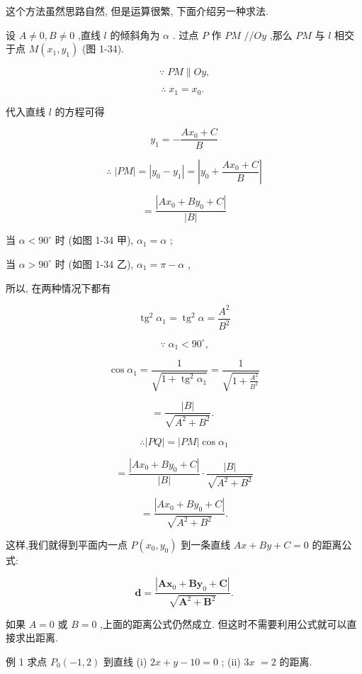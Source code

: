 \documentclass[lang=cn,newtx,12pt,scheme=chinese]{elegantbook}
\begin{document}
这个方法虽然思路自然, 但是运算很繁, 下面介绍另一种求法.

设 \(A \neq 0,B \neq 0\) ,直线 \(l\) 的倾斜角为 \(\alpha\) . 过点 \(P\) 作 \({PM}\) \(//{Oy}\) ,那么 \({PM}\) 与 \(l\) 相交于点 \(M\left( {{x}_{1},{y}_{1}}\right)\) (图 1-34).

\[
  \because \;{PM}\parallel {Oy}\text{,}
\]

\[
  \therefore \;{x}_{1} = {x}_{0}\text{. }
\]

代入直线 \(l\) 的方程可得

\[
    {y}_{1} = - \frac{A{x}_{0} + C}{B}
\]

\[
  \therefore \;\left| {PM}\right| = \left| {{y}_{0} - {y}_{1}}\right| = \left| {{y}_{0} + \frac{A{x}_{0} + C}{B}}\right|
\]

\[
  = \frac{\left| A{x}_{0} + B{y}_{0} + C\right| }{\left| B\right| }
\]

当 \(\alpha < {90}^{ \circ }\) 时 (如图 1-34 甲), \({\alpha }_{1} = \alpha\) ;

当 \(\alpha > {90}^{ \circ }\) 时 (如图 1-34 乙), \({\alpha }_{1} = \pi - \alpha\) ,

所以, 在两种情况下都有

\[
    {\operatorname{tg}}^{2}{\alpha }_{1} = {\operatorname{tg}}^{2}\alpha = \frac{{A}^{2}}{{B}^{2}}
\]

\[
  \because \;{\alpha }_{1} < {90}^{ \circ }\text{,}
\]

\[
  \cos {\alpha }_{1} = \frac{1}{\sqrt{1 + {\operatorname{tg}}^{2}{\alpha }_{1}}} = \frac{1}{\sqrt{1 + \frac{{A}^{2}}{{B}^{2}}}}
\]

\[
  = \frac{\left| B\right| }{\sqrt{{A}^{2} + {B}^{2}}}\text{. }
\]

\[
  \therefore \left| {PQ}\right| = \left| {PM}\right| \cos {\alpha }_{1}
\]

\[
  = \frac{\left| A{x}_{0} + B{y}_{0} + C\right| }{\left| B\right| } \cdot \frac{\left| B\right| }{\sqrt{{A}^{2} + {B}^{2}}}
\]

\[
  = \frac{\left| A{x}_{0} + B{y}_{0} + C\right| }{\sqrt{{A}^{2} + {B}^{2}}}.
\]
\begin{corollary}[点到直线的距离公式]
这样,我们就得到平面内一点 \(P\left( {{x}_{0},{y}_{0}}\right)\) 到一条直线 \({Ax} + {By} + C = 0\) 的距离公式:

\[
  \mathbf{d} = \frac{\left| \mathbf{A}{\mathbf{x}}_{0} + \mathbf{B}{\mathbf{y}}_{0} + \mathbf{C}\right| }{\sqrt{{\mathbf{A}}^{2} + {\mathbf{B}}^{2}}}.
\]

如果 \(A = 0\) 或 \(B = 0\) ,上面的距离公式仍然成立. 但这时不需要利用公式就可以直接求出距离.
\end{corollary}
例 1 求点 \({P}_{0}\left( {-1,2}\right)\) 到直线 (i) \({2x} + y - {10} = 0\) ; (ii) \({3x}\) \(= 2\) 的距离.
\end{document}
